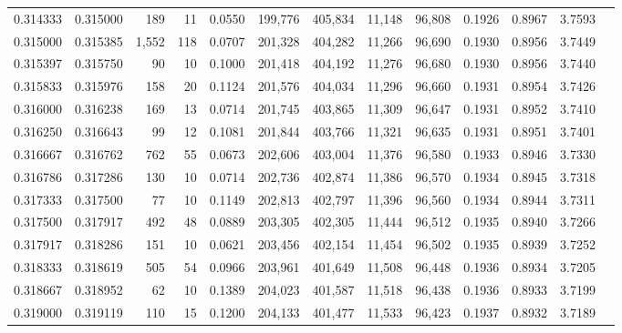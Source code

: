 \begin{tabular}{rrrrrrrrrrrrr}
0.314333 & 0.315000 &   189 &  11 &                                     0.0550 & 199,776 & 405,834 &  11,148 &  96,808 & 0.1926 & 0.8967 & 3.7593 \\
0.315000 & 0.315385 & 1,552 & 118 &                                     0.0707 & 201,328 & 404,282 &  11,266 &  96,690 & 0.1930 & 0.8956 & 3.7449 \\
0.315397 & 0.315750 &    90 &  10 &                                     0.1000 & 201,418 & 404,192 &  11,276 &  96,680 & 0.1930 & 0.8956 & 3.7440 \\
0.315833 & 0.315976 &   158 &  20 &                                     0.1124 & 201,576 & 404,034 &  11,296 &  96,660 & 0.1931 & 0.8954 & 3.7426 \\
0.316000 & 0.316238 &   169 &  13 &                                     0.0714 & 201,745 & 403,865 &  11,309 &  96,647 & 0.1931 & 0.8952 & 3.7410 \\
0.316250 & 0.316643 &    99 &  12 &                                     0.1081 & 201,844 & 403,766 &  11,321 &  96,635 & 0.1931 & 0.8951 & 3.7401 \\
0.316667 & 0.316762 &   762 &  55 &                                     0.0673 & 202,606 & 403,004 &  11,376 &  96,580 & 0.1933 & 0.8946 & 3.7330 \\
0.316786 & 0.317286 &   130 &  10 &                                     0.0714 & 202,736 & 402,874 &  11,386 &  96,570 & 0.1934 & 0.8945 & 3.7318 \\
0.317333 & 0.317500 &    77 &  10 &                                     0.1149 & 202,813 & 402,797 &  11,396 &  96,560 & 0.1934 & 0.8944 & 3.7311 \\
0.317500 & 0.317917 &   492 &  48 &                                     0.0889 & 203,305 & 402,305 &  11,444 &  96,512 & 0.1935 & 0.8940 & 3.7266 \\
0.317917 & 0.318286 &   151 &  10 &                                     0.0621 & 203,456 & 402,154 &  11,454 &  96,502 & 0.1935 & 0.8939 & 3.7252 \\
0.318333 & 0.318619 &   505 &  54 &                                     0.0966 & 203,961 & 401,649 &  11,508 &  96,448 & 0.1936 & 0.8934 & 3.7205 \\
0.318667 & 0.318952 &    62 &  10 &                                     0.1389 & 204,023 & 401,587 &  11,518 &  96,438 & 0.1936 & 0.8933 & 3.7199 \\
0.319000 & 0.319119 &   110 &  15 &                                     0.1200 & 204,133 & 401,477 &  11,533 &  96,423 & 0.1937 & 0.8932 & 3.7189 \\

\end{tabular}
